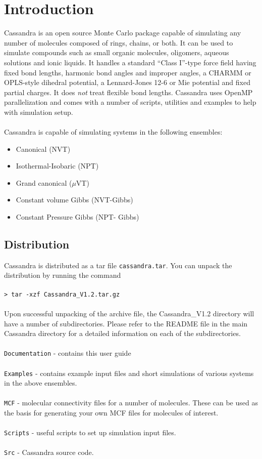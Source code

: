 \chapter{Introduction}
Cassandra is an open source Monte Carlo package capable of simulating
any number of molecules composed of rings, chains, or both. It can be
used to simulate compounds such as small organic molecules, oligomers,
aqueous solutions and ionic liquids. It handles a standard ``Class
I''-type force field having fixed bond lengths, harmonic bond angles
and improper angles, a CHARMM or OPLS-style dihedral potential, a
Lennard-Jones 12-6 or Mie potential and fixed partial charges. It does {\em
  not} treat flexible bond lengths. Cassandra uses OpenMP parallelization and comes
with a number of scripts, utilities and examples to help with
simulation setup. \\ \\ 
%
Cassandra is capable of simulating systems in the following ensembles: \\ 
%
\begin{itemize}
\item Canonical (NVT) 
\item Isothermal-Isobaric (NPT) 
\item Grand canonical ($\mu$VT) 
\item Constant volume Gibbs (NVT-Gibbs) 
\item Constant Pressure Gibbs (NPT- Gibbs)
\end{itemize}

\section{Distribution}
Cassandra is distributed as a tar file \texttt{cassandra.tar}. You can unpack the distribution by running the command \\ \\
%
\texttt{> tar -xzf Cassandra\_V1.2.tar.gz} \\ \\
%
Upon successful unpacking of the archive file, the Cassandra\_V1.2 directory will have a number of subdirectories. Please refer to the README file in the main Cassandra directory for a detailed information on each of the subdirectories. \\ \\
%
\texttt{Documentation} - contains this user guide\\ \\
%
\texttt{Examples} - contains example input files and short simulations of various systems in the above ensembles. \\ \\
%
\texttt{MCF} - molecular connectivity files for a number of
molecules. These can be used as the basis for generating your own MCF files for
molecules of interest. \\ \\ 
%
\texttt{Scripts} - useful scripts to set up simulation input files. \\ \\
%
\texttt{Src} - Cassandra source code. \\ \\
